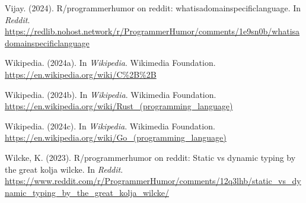 \documentclass[11pt]{article}
\begin{document}
\begin{hangparas}{1.5em}{1}
\hypertarget{citeproc_bib_item_42}{Vijay. (2024). R/programmerhumor on reddit: whatisadomainspecificlanguage. In \textit{Reddit}. \url{https://redlib.nohost.network/r/ProgrammerHumor/comments/1e9sn0b/whatisadomainspecificlanguage}}

\hypertarget{citeproc_bib_item_43}{Wikipedia. (2024a). In \textit{Wikipedia}. Wikimedia Foundation. \url{https://en.wikipedia.org/wiki/C\%2B\%2B}}

\hypertarget{citeproc_bib_item_44}{Wikipedia. (2024b). In \textit{Wikipedia}. Wikimedia Foundation. \url{https://en.wikipedia.org/wiki/Rust_(programming_language)}}

\hypertarget{citeproc_bib_item_45}{Wikipedia. (2024c). In \textit{Wikipedia}. Wikimedia Foundation. \url{https://en.wikipedia.org/wiki/Go_(programming_language)}}

\hypertarget{citeproc_bib_item_46}{Wilcke, K. (2023). R/programmerhumor on reddit: Static vs dynamic typing by the great kolja wilcke. In \textit{Reddit}. \url{https://www.reddit.com/r/ProgrammerHumor/comments/12q3lhb/static_vs_dynamic_typing_by_the_great_kolja_wilcke/}}\bigskip
\end{hangparas}
\end{document}
